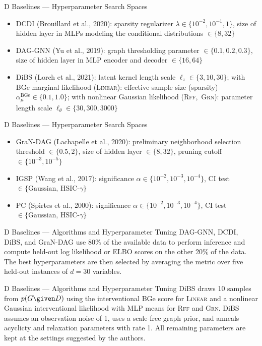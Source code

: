 \documentclass[aspectratio=169,10pt]{beamer}
\newcommand{\domain}[1]{\textsc{#1}}
\newcommand{\lineardomain}{\domain{Linear}\xspace}
\newcommand{\rffdomain}{\domain{Rff}\xspace}
\newcommand{\grndomain}{\domain{Grn}\xspace}
\begin{document}
\begin{frame}{D Baselines --- Hyperparameter Search Spaces}
\small
\begin{itemize}
    \item DCDI (Brouillard et al., 2020): sparsity regularizer $\lambda \in \{10^{-2}, 10^{-1}, 1 \}$, size of hidden layer in MLPs modeling the conditional distributions $\in \{8, 32\}$
    \item DAG-GNN (Yu et al., 2019): graph thresholding parameter $\in \{0.1, 0.2, 0.3\}$, size of hidden layer in MLP encoder and decoder $\in \{16, 64\}$
    \item DiBS (Lorch et al., 2021): latent kernel length scale $\ell_z \in \{3, 10, 30\}$; with BGe marginal likelihood (\lineardomain): effective sample size (sparsity) $\alpha_\mu^\text{BGe} \in \{0.1, 1.0\}$; with nonlinear Gaussian likelihood (\rffdomain,~\grndomain): parameter length scale $\ell_\theta \in \{30, 300, 3000\}$
\end{itemize}
\end{frame}

\begin{frame}{D Baselines --- Hyperparameter Search Spaces}
\small
\begin{itemize}
    \item GraN-DAG (Lachapelle et al., 2020): preliminary neighborhood selection threshold $\in \{0.5, 2\}$, size of hidden layer $\in \{8, 32\}$, pruning cutoff $\in \{10^{-3}, 10^{-5}\}$
    \item IGSP (Wang et al., 2017): significance $\alpha \in \{10^{-2}, 10^{-3}, 10^{-4}\}$, CI test $\in \{\text{Gaussian, HSIC-$\gamma$}\}$
    \item PC (Spirtes et al., 2000): significance $\alpha \in \{10^{-2}, 10^{-3}, 10^{-4}\}$, CI test $\in \{\text{Gaussian, HSIC-$\gamma$}\}$
\end{itemize}
\end{frame}

\begin{frame}{D Baselines --- Algorithms and Hyperparameter Tuning}
\small
DAG-GNN, DCDI, DiBS, and GraN-DAG use 80\% of the available data to perform inference and compute held-out log likelihood or ELBO scores on the other 20\% of the data. The best hyperparameters are then selected by averaging the metric over five held-out instances of $d=30$ variables.
\end{frame}

\begin{frame}{D Baselines --- Algorithms and Hyperparameter Tuning}
\small
DiBS draws \num{10} samples from $p(G \given D)$ using the interventional BGe score for \lineardomain and a nonlinear Gaussian interventional likelihood with MLP means for \rffdomain and \grndomain. DiBS assumes an observation noise of \num{1}, uses a scale-free graph prior, and anneals acyclicty and relaxation parameters with rate \num{1}. All remaining parameters are kept at the settings suggested by the authors.
\end{frame}
\end{document}
